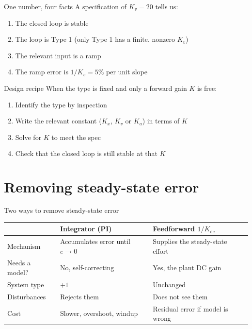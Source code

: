 \documentclass[aspectratio=169,12pt]{beamer}
\begin{document}
\begin{frame}{One number, four facts}
  A specification of \alert{$K_v = 20$} tells us:
  \begin{enumerate}
    \item The closed loop is stable
    \item The loop is Type 1 (only Type 1 has a finite, nonzero $K_v$)
    \item The relevant input is a ramp
    \item The ramp error is $1/K_v = 5\%$ per unit slope
  \end{enumerate}
\end{frame}

\begin{frame}{Design recipe}
  When the type is fixed and only a forward gain $K$ is free:
  \begin{enumerate}
    \item Identify the type by inspection
    \item Write the relevant constant ($K_x$, $K_v$ or $K_a$) in terms of $K$
    \item Solve for $K$ to meet the spec
    \item \alert{Check that the closed loop is still stable at that $K$}
  \end{enumerate}
\end{frame}

\section{Removing steady-state error}

\begin{frame}{Two ways to remove steady-state error}
  \begin{center}
  \small
  \renewcommand{\arraystretch}{1.35}
  \begin{tabular}{@{}l>{\raggedright\arraybackslash}p{4.6cm}>{\raggedright\arraybackslash}p{4.6cm}@{}}
    \toprule
                   & \textbf{Integrator (PI)}       & \textbf{Feedforward $1/K_{\mathrm{dc}}$} \\
    \midrule
    Mechanism      & Accumulates error until $e \to 0$ & Supplies the steady-state effort \\
    Needs a model? & No, self-correcting            & Yes, the plant DC gain \\
    System type    & $+1$                           & Unchanged \\
    Disturbances   & Rejects them                   & Does not see them \\
    Cost           & Slower, overshoot, windup      & Residual error if model is wrong \\
    \bottomrule
  \end{tabular}
  \end{center}
\end{frame}
\end{document}
